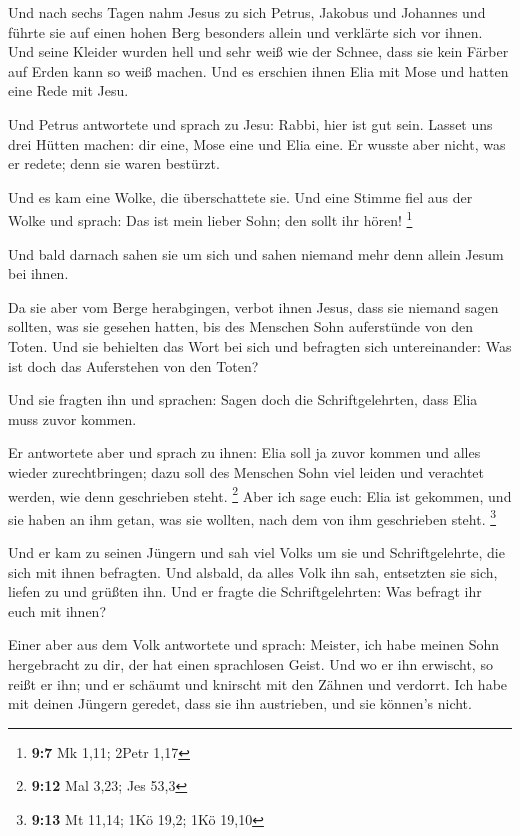  Und nach sechs Tagen nahm Jesus zu sich Petrus, Jakobus und
Johannes und führte sie auf einen hohen Berg besonders allein und
verklärte sich vor ihnen.  Und seine Kleider wurden hell und
sehr weiß wie der Schnee, dass sie kein Färber auf Erden kann so weiß
machen.  Und es erschien ihnen Elia mit Mose und hatten eine
Rede mit Jesu.

 Und Petrus antwortete und sprach zu Jesu: Rabbi, hier ist
gut sein. Lasset uns drei Hütten machen: dir eine, Mose eine und Elia
eine.  Er wusste aber nicht, was er redete; denn sie waren
bestürzt.

 Und es kam eine Wolke, die überschattete sie. Und eine
Stimme fiel aus der Wolke und sprach: Das ist mein lieber Sohn; den
sollt ihr hören! \footnote{\textbf{9:7} Mk 1,11; 2Petr 1,17}

 Und bald darnach sahen sie um sich und sahen niemand mehr
denn allein Jesum bei ihnen.

 Da sie aber vom Berge herabgingen, verbot ihnen Jesus, dass
sie niemand sagen sollten, was sie gesehen hatten, bis des Menschen Sohn
auferstünde von den Toten.  Und sie behielten das Wort bei
sich und befragten sich untereinander: Was ist doch das Auferstehen von
den Toten?

 Und sie fragten ihn und sprachen: Sagen doch die
Schriftgelehrten, dass Elia muss zuvor kommen.

 Er antwortete aber und sprach zu ihnen: Elia soll ja zuvor
kommen und alles wieder zurechtbringen; dazu soll des Menschen Sohn viel
leiden und verachtet werden, wie denn geschrieben steht. \footnote{\textbf{9:12}
  Mal 3,23; Jes 53,3}  Aber ich sage euch: Elia ist
gekommen, und sie haben an ihm getan, was sie wollten, nach dem von ihm
geschrieben steht. \footnote{\textbf{9:13} Mt 11,14; 1Kö 19,2; 1Kö 19,10}

 Und er kam zu seinen Jüngern und sah viel Volks um sie und
Schriftgelehrte, die sich mit ihnen befragten.  Und
alsbald, da alles Volk ihn sah, entsetzten sie sich, liefen zu und
grüßten ihn.  Und er fragte die Schriftgelehrten: Was
befragt ihr euch mit ihnen?

 Einer aber aus dem Volk antwortete und sprach: Meister,
ich habe meinen Sohn hergebracht zu dir, der hat einen sprachlosen
Geist.  Und wo er ihn erwischt, so reißt er ihn; und er
schäumt und knirscht mit den Zähnen und verdorrt. Ich habe mit deinen
Jüngern geredet, dass sie ihn austrieben, und sie können's nicht.

